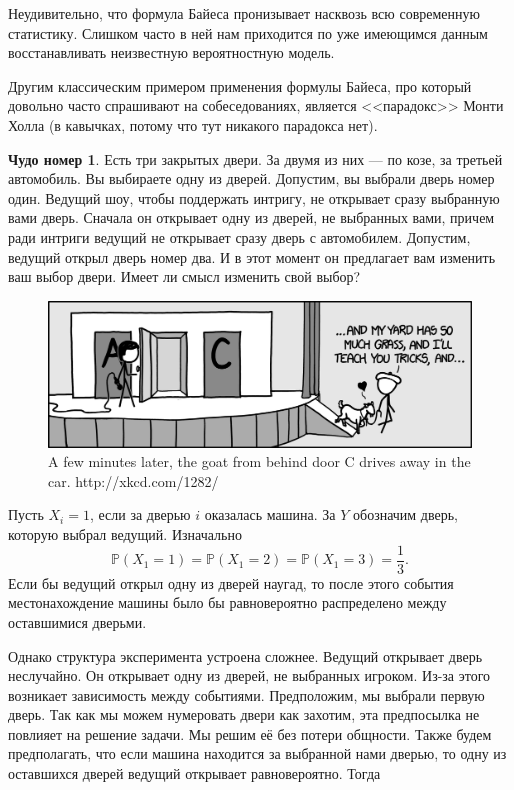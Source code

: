 \documentclass[12pt, a4paper, oneside]{extreport}
\def \mbb{\mathbb}
\def \PP{\mbb{P}}
\theoremstyle{plain}              %
\theoremstyle{definition}         %
\newtheorem{chudo}{Чудо номер}   %
\begin{document}
Неудивительно, что формула Байеса пронизывает насквозь всю современную статистику. Слишком часто в ней нам приходится по уже имеющимся данным восстанавливать неизвестную вероятностную модель. 

Другим классическим примером применения формулы Байеса, про который довольно часто спрашивают на собеседованиях, является  <<парадокс>> Монти Холла (в кавычках, потому что тут никакого парадокса нет).

\begin{chudo}
Есть три закрытых двери. За двумя из них — по козе, за третьей автомобиль. Вы выбираете одну из дверей. Допустим, вы выбрали дверь номер один.  Ведущий шоу, чтобы поддержать интригу, не открывает сразу выбранную вами дверь. Сначала он открывает одну из дверей, не выбранных вами, причем ради интриги ведущий не открывает сразу дверь с автомобилем. Допустим, ведущий открыл дверь номер два. И в этот момент он предлагает вам изменить ваш выбор двери. Имеет ли смысл изменить свой выбор? 
\end{chudo}

\begin{figure}
\begin{center}
\includegraphics[width=0.8\linewidth]{goat.png}
\end{center}
\caption{A few minutes later, the goat from behind door C drives away in the car. http://xkcd.com/1282/}
\end{figure}

Пусть $X_i = 1$, если за дверью $i$ оказалась машина. За $Y$ обозначим дверь, которую выбрал ведущий. Изначально \[\PP(X_1 = 1) = \PP(X_1 = 2) = \PP(X_1 = 3) = \frac{1}{3}.\]  Если бы ведущий открыл одну из дверей наугад, то после этого события местонахождение машины было бы равновероятно распределено между оставшимися дверьми. 

Однако структура эксперимента устроена сложнее. Ведущий открывает дверь неслучайно. Он открывает одну из дверей, не выбранных игроком.  Из-за этого возникает зависимость между событиями. Предположим, мы выбрали первую дверь. Так как мы можем нумеровать двери как захотим, эта предпосылка не повлияет на решение задачи. Мы решим её без потери общности. Также будем предполагать, что если машина находится за выбранной нами дверью, то одну из оставшихся дверей ведущий открывает равновероятно.  Тогда 
\end{document}
